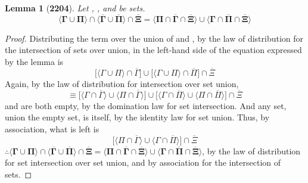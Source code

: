 \documentclass[preview]{standalone}
\newtheorem*{lemma*}{Lemma}
\begin{document}
\begin{lemma*}[\textbf{2204}] \color{black}
    Let \bm{$\Gamma$}, \bm{$\Pi$}, and \bm{$\Xi$} be sets.
    \begin{equation*}
    \bm{
        \Big \langle \Gamma \cup \Pi \Big \rangle
            \cap
        \Big \langle \overline{\Gamma} \cup \overline{\Pi} \Big \rangle
            \cap
        \overline{\Xi}
            =
        \Big \langle \Pi \cap \overline{\Gamma} \cap \overline{\Xi} \Big \rangle
            \cup
        \Big \langle \Gamma \cap \overline{\Pi} \cap \overline{\Xi} \Big \rangle
        }
    \end{equation*}
\end{lemma*}
\begin{proof} \color{black}
    Distributing the term \bm{$\Gamma \cup \Pi$} over the union of 
    \bm{$\overline{\Gamma}$} and \bm{$\overline{\Pi}$},
    by the law of distribution for the intersection of sets over union,
    in the left-hand side of the equation expressed by the lemma is
    \begin{equation*}
        \bigg[
            \Big \langle \Gamma \cup \Pi \Big \rangle
                \cap
            \overline{\Gamma}
        \bigg]
            \cup
        \bigg[
            \Big \langle \Gamma \cup \Pi \Big \rangle
                \cap
            \overline{\Pi}
        \bigg]
            \cap
        \overline{\Xi}
    \end{equation*}
    Again, by the law of distribution for intersection over set union,
    \begin{equation*}
        \equiv
        \bigg[
            \Big \langle \Gamma \cap \overline{\Gamma} \Big \rangle
                \cup
            \Big \langle \Pi \cap \overline{\Gamma} \Big \rangle
        \bigg]
            \cup
        \bigg[
            \Big \langle \Gamma \cap \overline{\Pi} \Big \rangle
                \cup
            \Big \langle \Pi \cap \overline{\Pi} \Big \rangle
        \bigg]
            \cap
        \overline{\Xi}
    \end{equation*}
    \bm{$\Gamma \cap \overline{\Gamma}$} and \bm{$\Pi \cap \overline{\Pi}$}
    are both empty, by the domination law for set intersection. And any set,
    union the empty set, is itself, by the identity law for set union. Thus,
    by association, what is left is
    \begin{equation*}       
        \bigg[
            \Big \langle \Pi \cap \overline{\Gamma} \Big \rangle
                \cup
            \Big \langle \Gamma \cap \overline{\Pi} \Big \rangle
        \bigg]
            \cap
        \overline{\Xi}
    \end{equation*}
    $\therefore \bm{
        \big \langle \Gamma \cup \Pi \big \rangle
            \cap
        \big \langle \overline{\Gamma} \cup \overline{\Pi} \big \rangle
            \cap
        \overline{\Xi}
            =
        \big \langle \Pi \cap \overline{\Gamma} \cap \overline{\Xi} \big \rangle
            \cup
        \big \langle \Gamma \cap \overline{\Pi} \cap \overline{\Xi} \big \rangle
    }$,
    by the law of distribution for set intersection over set union,
    and by association for the intersection of sets.
    
\color{lightgray} \end{proof}
\end{document}
